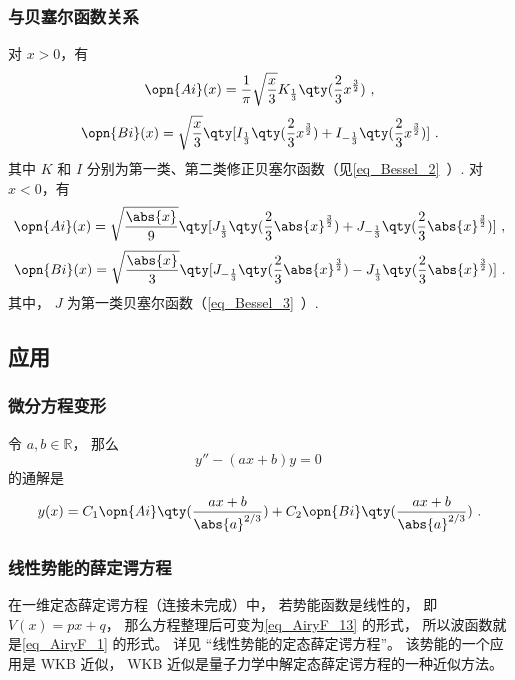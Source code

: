 \subsubsection{与贝塞尔函数关系}
对 $x>0$，有
\begin{equation}
\opn{Ai}(x)=\frac1\pi \sqrt{\frac x3} K_{\frac13} \qty(\frac23 x^{\frac32})~,
\end{equation}\begin{equation}
\opn{Bi}(x)=\sqrt{\frac x3} \qty[I_{\frac13}\qty(\frac23 x^{\frac32})+I_{-\frac13}\qty(\frac23 x^{\frac32})]~.
\end{equation}
其中 $K$ 和 $I$ 分别为第一类、第二类修正贝塞尔函数（见\autoref{eq_Bessel_2}~）.
对 $x<0$，有
\begin{equation}
\opn{Ai}(x)=\sqrt{\frac{\abs{x}}{9}}\qty[J_{\frac13}\qty(\frac23 \abs{x}^{\frac32})+J_{-\frac13}\qty(\frac23 \abs{x}^{\frac32})]~,
\end{equation}
\begin{equation}
\opn{Bi}(x)=\sqrt{\frac{\abs{x}}{3}} \qty[J_{-\frac13}\qty(\frac23 \abs{x}^{\frac32})-J_{\frac13}\qty(\frac23 \abs{x}^{\frac32})]~.
\end{equation}
其中， $J$ 为第一类贝塞尔函数（\autoref{eq_Bessel_3}~）.

\subsection{应用}
\subsubsection{微分方程变形}
令 $a, b\in \mathbb R$， 那么
\begin{equation}\label{eq_AiryF_13}
y'' - (ax + b) y = 0~
\end{equation}
的通解是
\begin{equation}\label{eq_AiryF_1}
y(x) = C_1\opn{Ai}\qty(\frac{ax+b}{\abs{a}^{2/3}}) + C_2 \opn{Bi}\qty(\frac{ax+b}{\abs{a}^{2/3}})~.
\end{equation}


\subsubsection{线性势能的薛定谔方程}
在一维定态薛定谔方程（连接未完成）中， 若势能函数是线性的， 即 $V(x) = px + q$， 那么方程整理后可变为\autoref{eq_AiryF_13} 的形式， 所以波函数就是\autoref{eq_AiryF_1} 的形式。 详见 “线性势能的定态薛定谔方程”。 该势能的一个应用是 WKB 近似， WKB 近似是量子力学中解定态薛定谔方程的一种近似方法。

